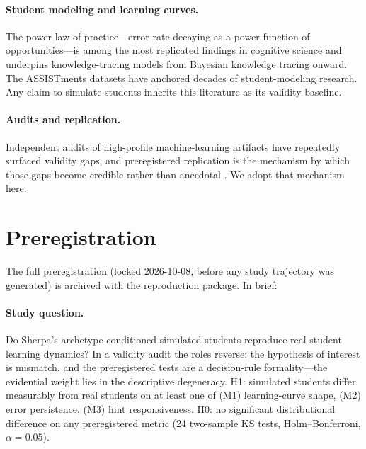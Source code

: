 \documentclass[notitlepage,12pt]{jedm}
\begin{document}
\paragraph{Student modeling and learning curves.} The power law of
practice---error rate decaying as a power function of opportunities---is
among the most replicated findings in cognitive science \citep{newell1981}
and underpins knowledge-tracing models from Bayesian knowledge tracing
\citep{corbett1994} onward. The ASSISTments datasets \citep{feng2009} have
anchored decades of student-modeling research. Any claim to simulate
students inherits this literature as its validity baseline.

\paragraph{Audits and replication.} Independent audits of high-profile
machine-learning artifacts have repeatedly surfaced validity gaps, and
preregistered replication is the mechanism by which those gaps become
credible rather than anecdotal \citep{nosek2018}. We adopt that mechanism
here.

\section{Preregistration}
\label{sec:prereg}

The full preregistration (locked 2026-10-08, before any study trajectory was
generated) is archived with the reproduction package. In brief:

\paragraph{Study question.} Do Sherpa's archetype-conditioned simulated
students reproduce real student learning dynamics? In a validity audit
the roles reverse: the hypothesis of interest is mismatch, and the
preregistered tests are a decision-rule formality---the evidential weight
lies in the descriptive degeneracy. H1: simulated students
differ measurably from real students on at least one of (M1) learning-curve
shape, (M2) error persistence, (M3) hint responsiveness. H0: no significant
distributional difference on any preregistered metric (24 two-sample KS
tests, Holm--Bonferroni, $\alpha=0.05$).
\end{document}
